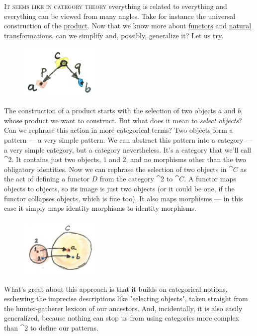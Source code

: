 
\lettrine[lhang=0.17]{I}{t seems like in category theory} everything is related to everything and
everything can be viewed from many angles. Take for instance the
universal construction of the \hyperref[products-and-coproducts]{product}.
Now that we know more about \hyperref[functors]{functors} and
\hyperref[natural-transformations]{natural transformations}, can we simplify and, possibly, generalize it? Let us
try.

\begin{figure}[H]
\centering
\includegraphics[width=1.56250in]{images/productpattern.jpg}
\end{figure}

\noindent
The construction of a product starts with the selection of two objects
$a$ and $b$, whose product we want to construct. But what
does it mean to \emph{select objects}? Can we rephrase this action in
more categorical terms? Two objects form a pattern --- a very simple
pattern. We can abstract this pattern into a category --- a very simple
category, but a category nevertheless. It's a category that we'll call
$\cat{2}$. It contains just two objects, $1$ and $2$, and no morphisms
other than the two obligatory identities. Now we can rephrase the
selection of two objects in $\cat{C}$ as the act of defining a functor $D$
from the category $\cat{2}$ to $\cat{C}$. A functor maps objects to
objects, so its image is just two objects (or it could be one, if the
functor collapses objects, which is fine too). It also maps morphisms
--- in this case it simply maps identity morphisms to identity
morphisms.

\begin{figure}[H]
\centering
\includegraphics[width=1.56250in]{images/two.jpg}
\end{figure}

\noindent
What's great about this approach is that it builds on categorical
notions, eschewing the imprecise descriptions like "selecting
objects", taken stra\-ight from the hunter-gatherer lexicon of our
ancestors. And, incidentally, it is also easily generalized, because
nothing can stop us from using categories more complex than $\cat{2}$
to define our patterns.

